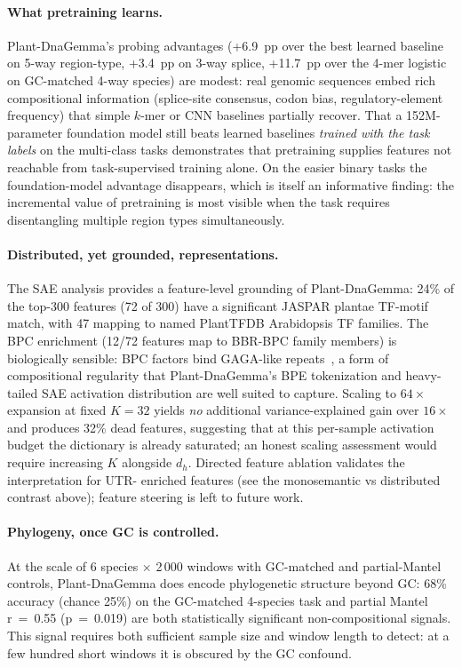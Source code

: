 \documentclass[11pt, a4paper]{article}
\begin{document}
\paragraph{What pretraining learns.}
Plant-DnaGemma's probing advantages (+6.9~pp over the best learned
baseline on 5-way region-type, +3.4~pp on 3-way splice, +11.7~pp over the
4-mer logistic on GC-matched 4-way species) are modest: real genomic
sequences embed rich compositional information (splice-site consensus,
codon bias, regulatory-element frequency) that simple $k$-mer or CNN
baselines partially recover. That a 152M-parameter foundation model
still beats learned baselines \emph{trained with the task labels} on the
multi-class tasks demonstrates that pretraining supplies features not
reachable from task-supervised training alone. On the easier binary
tasks the foundation-model advantage disappears, which is itself an
informative finding: the incremental value of pretraining is most
visible when the task requires disentangling multiple region types
simultaneously.

\paragraph{Distributed, yet grounded, representations.}
The SAE analysis provides a feature-level grounding of Plant-DnaGemma:
24\% of the top-300 features (72 of 300) have a significant JASPAR
plantae TF-motif match, with 47 mapping to named PlantTFDB Arabidopsis
TF families. The BPC enrichment (12/72 features map to BBR-BPC family
members) is biologically sensible: BPC factors bind GAGA-like
repeats~\citep{meister2004high}, a form of compositional regularity that
Plant-DnaGemma's BPE tokenization and heavy-tailed SAE activation
distribution are well suited to capture. Scaling to $64\times$ expansion
at fixed $K{=}32$ yields \emph{no} additional variance-explained gain
over $16\times$ and produces 32\% dead features, suggesting that at
this per-sample activation budget the dictionary is already saturated;
an honest scaling assessment would require increasing $K$ alongside
$d_h$. Directed feature ablation validates the interpretation for UTR-
enriched features (see the monosemantic vs distributed contrast above);
feature steering is left to future work.

\paragraph{Phylogeny, once GC is controlled.}
At the scale of 6 species $\times$ 2\,000 windows with GC-matched and
partial-Mantel controls, Plant-DnaGemma does encode phylogenetic
structure beyond GC: 68\% accuracy (chance 25\%) on the GC-matched
4-species task and partial Mantel r~=~0.55 (p~=~0.019) are both
statistically significant non-compositional signals. This signal
requires both sufficient sample size and window length to detect: at a
few hundred short windows it is obscured by the GC confound.
\end{document}
